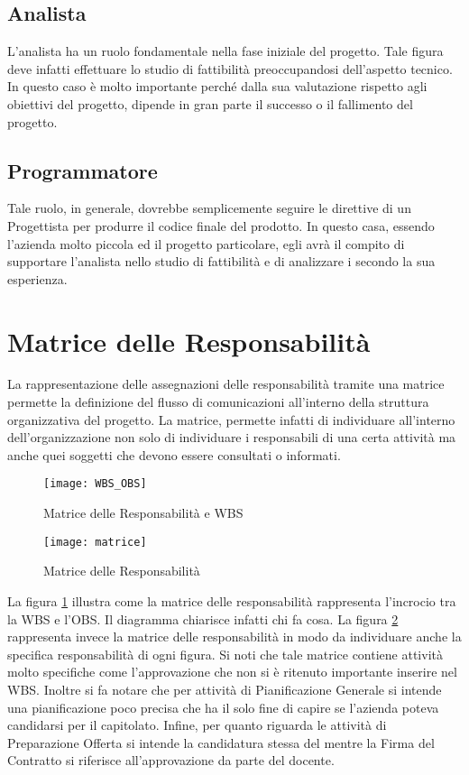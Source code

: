 \subsection{Analista}
	L'analista ha un ruolo fondamentale nella fase iniziale del progetto. Tale figura deve infatti effettuare lo studio di fattibilità preoccupandosi dell'aspetto tecnico. In questo caso è molto importante perché dalla sua valutazione rispetto agli obiettivi del progetto, dipende in gran parte il successo o il fallimento del progetto.
\subsection{Programmatore}
	 Tale ruolo, in generale, dovrebbe semplicemente seguire le direttive di un Progettista per produrre il codice finale del prodotto. In questo casa, essendo l'azienda molto piccola ed il progetto particolare, egli avrà il compito di supportare l'analista nello studio di fattibilità e di analizzare i  secondo la sua esperienza.




\section{Matrice delle Responsabilità}
La rappresentazione delle assegnazioni delle responsabilità tramite una matrice permette la definizione del flusso di comunicazioni all'interno della struttura organizzativa del progetto. La matrice, permette infatti di individuare all'interno dell'organizzazione non solo di individuare i responsabili di una certa attività ma anche quei soggetti che devono essere consultati o informati.



\begin{figure}[H]
  \texttt{[image: WBS\_OBS]}
	\caption{Matrice delle Responsabilità e WBS}
	\label{fig: WBS_OBS}
\end{figure} 



\begin{figure}[H]
  \texttt{[image: matrice]}
  	\label{fig:matrice}
	\caption{Matrice delle Responsabilità}
\end{figure}

La figura \ref{fig: WBS_OBS} illustra come la matrice delle responsabilità rappresenta l'incrocio tra la WBS e l'OBS. Il diagramma chiarisce infatti chi fa cosa.
La figura \ref{fig:matrice} rappresenta invece la matrice delle responsabilità in modo da individuare anche la specifica responsabilità di ogni figura. Si noti che tale matrice contiene attività molto specifiche come l'approvazione che non si è ritenuto importante inserire nel WBS. Inoltre si fa notare che per attività di Pianificazione Generale si intende una pianificazione poco precisa che ha il solo fine di capire se l'azienda poteva candidarsi per il capitolato. Infine, per quanto riguarda le attività di Preparazione Offerta si intende la candidatura stessa del  mentre la Firma del Contratto si riferisce all'approvazione da parte del docente.

